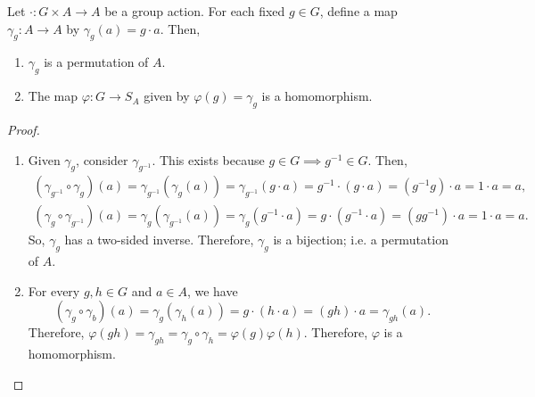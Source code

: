 \documentclass[11pt]{penrose}
\begin{document}
\begin{nprop}\label{thm:action-to-hom}
    Let $\cdot : G \times A \to A$ be a group action. For each fixed $g \in G$, define a map $\gamma_{g} : A \to A$ by $\gamma_{g}(a) = g \cdot a$. Then,
    \begin{enumerate}
        \item $\gamma_{g}$ is a permutation of $A$.
        \item The map $\varphi : G \to S_{A}$ given by $\varphi(g) = \gamma_{g}$ is a homomorphism.
    \end{enumerate}
\end{nprop}
\begin{proof}
    \phantom{.}
    \begin{enumerate}
        \item Given $\gamma_{g}$, consider $\gamma_{g^{-1}}$. This exists because $g \in G \implies g^{-1} \in G$. Then,
        \begin{gather*}
            (\gamma_{g^{-1}} \circ \gamma_{g})(a)
            = \gamma_{g^{-1}} (\gamma_{g}(a))
            = \gamma_{g^{-1}} (g \cdot a)
            = g^{-1} \cdot (g \cdot a)
            = (g^{-1}g) \cdot a
            = 1 \cdot a
            = a,\\
            (\gamma_{g} \circ \gamma_{g^{-1}})(a)
            = \gamma_{g} (\gamma_{g^{-1}}(a))
            = \gamma_{g} (g^{-1} \cdot a)
            = g \cdot (g^{-1} \cdot a)
            = (gg^{-1}) \cdot a
            = 1 \cdot a
            = a.
        \end{gather*}
        So, $\gamma_{g}$ has a two-sided inverse. Therefore, $\gamma_{g}$ is a bijection; i.e. a permutation of $A$.

        \item For every $g, h \in G$ and $a \in A$, we have
        \begin{equation*}
            (\gamma_{g} \circ \gamma_{b}) (a)
            = \gamma_{g} (\gamma_{h} (a))
            = g \cdot (h \cdot a)
            = (gh) \cdot a
            = \gamma_{gh}(a).
        \end{equation*}
        Therefore, $\varphi(gh) = \gamma_{gh} = \gamma_{g} \circ \gamma_{h} = \varphi(g)\varphi(h)$. Therefore, $\varphi$ is a homomorphism.
        \qedhere
    \end{enumerate}
\end{proof}
\end{document}
